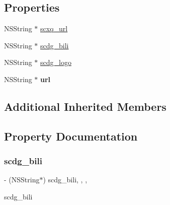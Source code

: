 \subsection*{Properties}
\begin{DoxyCompactItemize}
\item 
N\+S\+String $\ast$ \mbox{\hyperlink{interface_j_m_rebate_web_view_controller_ac804af310bf3c5b724d1f0efacb17417}{scxq\+\_\+url}}
\item 
N\+S\+String $\ast$ \mbox{\hyperlink{interface_j_m_rebate_web_view_controller_ac2e5d6e82563d69decb02470ab420aaa}{scdg\+\_\+bili}}
\item 
N\+S\+String $\ast$ \mbox{\hyperlink{interface_j_m_rebate_web_view_controller_a93cf4a00ffd532a1f420eb4819766646}{scdg\+\_\+logo}}
\item 
\mbox{\label{interface_j_m_rebate_web_view_controller_ad8c8ff1f37cd72362ff552c74f5733bf}} 
N\+S\+String $\ast$ {\bfseries url}
\end{DoxyCompactItemize}
\subsection*{Additional Inherited Members}


\subsection{Property Documentation}
\mbox{\label{interface_j_m_rebate_web_view_controller_ac2e5d6e82563d69decb02470ab420aaa}} 
\subsubsection{\texorpdfstring{scdg\+\_\+bili}{scdg\_bili}}
{\footnotesize\ttfamily -\/ (N\+S\+String$\ast$) scdg\+\_\+bili\hspace{0.3cm}{\ttfamily [read]}, {\ttfamily [write]}, {\ttfamily [nonatomic]}, {\ttfamily [copy]}}

scdg\+\_\+bili \mbox{\label{interface_j_m_rebate_web_view_controller_a93cf4a00ffd532a1f420eb4819766646}} 
